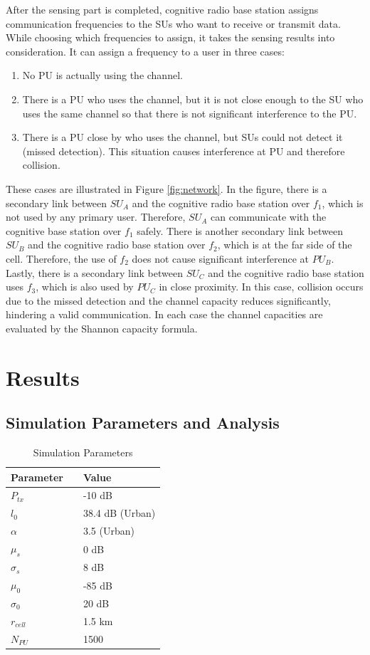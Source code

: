 \documentclass[conference,compsoc]{IEEEtran}
\newcommand{\CR}{cognitive radio }
\begin{document}
After the sensing part is completed, \CR base station assigns communication frequencies to the SUs who want to receive or transmit data. While choosing which frequencies to assign, it takes the sensing results into consideration. It can assign a frequency to a user in three cases:
\begin{enumerate}
\item No PU is actually using the channel.
\item There is a PU who uses the channel, but it is not close enough to the SU who uses the same channel so that there is not significant interference to the PU.
\item There is a PU close by who uses the channel, but SUs could not detect it (missed detection). This situation causes interference at PU and therefore collision.
\end{enumerate}

These cases are illustrated in Figure \ref{fig:network}. In the figure, there is a secondary link between $SU_A$ and the \CR base station over $f_1$, which is not used by any primary user. Therefore, $SU_A$ can communicate with the cognitive base station over $f_1$ safely. There is another secondary link between $SU_B$ and the \CR base station over $f_2$, which is at the far side of the cell. Therefore, the use of $f_2$ does not cause significant interference at $PU_B$. Lastly, there is a secondary link between $SU_C$ and the \CR base station uses $f_3$, which is also used by $PU_C$ in close proximity. In this case, collision occurs due to the missed detection and the channel capacity reduces significantly, hindering a valid communication. In each case the channel capacities are evaluated by the Shannon capacity formula.

\section{\label{sec:results}Results}
\subsection{Simulation Parameters and Analysis}

\begin{table}[!htb]
\renewcommand{\arraystretch}{1.2}
\caption{Simulation Parameters}
\label{tbl:sim_parameters}
\centering
\begin{tabular}{l c l}
  \hline
  Parameter & & Value\\
  \hline
  $P_{tx}$ & & -10 dB \\
  $l_0$    & & 38.4 dB (Urban) \\
  $\alpha$ & & 3.5 (Urban)\\
  $\mu_s$  & & 0 dB\\
  $\sigma_s$ & & 8 dB\\
  $\mu_0$  & & -85 dB \\
  $\sigma_0$ & & 20 dB \\
  $r_{cell}$ & & 1.5 km\\
  $N_{PU}$ & & 1500\\
  \hline
\end{tabular}
\end{table}
\end{document}
